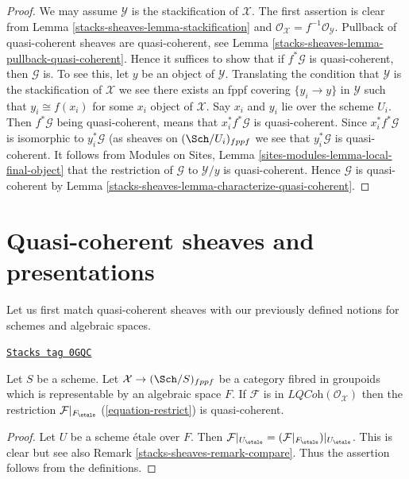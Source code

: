 \begin{proof}
We may assume $\mathcal{Y}$ is the stackification of $\mathcal{X}$.
The first assertion is clear from
Lemma \ref{stacks-sheaves-lemma-stackification}
and
$\mathcal{O}_\mathcal{X} = f^{-1}\mathcal{O}_\mathcal{Y}$.
Pullback of quasi-coherent sheaves are quasi-coherent, see
Lemma \ref{stacks-sheaves-lemma-pullback-quasi-coherent}.
Hence it suffices to show that if $f^*\mathcal{G}$ is
quasi-coherent, then $\mathcal{G}$ is.
To see this, let $y$ be an object of $\mathcal{Y}$.
Translating the condition that $\mathcal{Y}$ is the stackification
of $\mathcal{X}$ we see there exists an fppf covering $\{y_i \to y\}$
in $\mathcal{Y}$ such that $y_i \cong f(x_i)$ for some
$x_i$ object of $\mathcal{X}$. Say $x_i$ and $y_i$ lie over the scheme $U_i$.
Then $f^*\mathcal{G}$ being quasi-coherent, means that $x_i^*f^*\mathcal{G}$
is quasi-coherent. Since $x_i^*f^*\mathcal{G}$ is isomorphic to
$y_i^*\mathcal{G}$ (as sheaves on $(\Sch/U_i)_{fppf}$ we
see that $y_i^*\mathcal{G}$ is quasi-coherent.
It follows from
Modules on Sites, Lemma \ref{sites-modules-lemma-local-final-object}
that the restriction of $\mathcal{G}$ to $\mathcal{Y}/y$ is
quasi-coherent. Hence $\mathcal{G}$ is quasi-coherent by
Lemma \ref{stacks-sheaves-lemma-characterize-quasi-coherent}.
\end{proof}

\section{Quasi-coherent sheaves and presentations}
\label{stacks-sheaves-section-quasi-coherent-presentation}
Let us first match quasi-coherent sheaves with our previously defined
notions for schemes and algebraic spaces.

\begin{lemma}
\label{stacks-sheaves-lemma-compare-locally-quasi-coherent}
\href{https://stacks.math.columbia.edu/tag/0GQC}{\texttt{Stacks tag 0GQC}}

Let $S$ be a scheme. Let $\mathcal{X} \to (\Sch/S)_{fppf}$ be a category
fibred in groupoids which is representable by an algebraic space $F$.
If $\mathcal{F}$ is in $\textit{LQCoh}(\mathcal{O}_\mathcal{X})$
then the restriction $\mathcal{F}|_{F_\etale}$ (\ref{equation-restrict})
is quasi-coherent.
\end{lemma}

\begin{proof}
Let $U$ be a scheme \'etale over $F$. Then
$\mathcal{F}|_{U_\etale} = (\mathcal{F}|_{F_\etale})|_{U_\etale}$.
This is clear but see also Remark \ref{stacks-sheaves-remark-compare}.
Thus the assertion follows from the definitions.
\end{proof}

